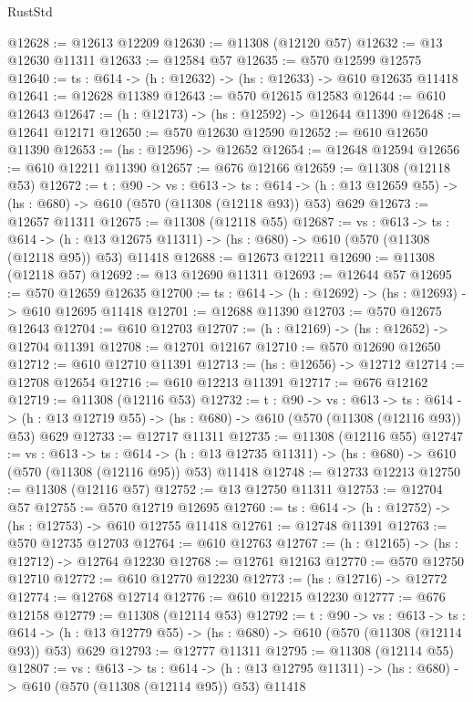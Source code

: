 \begin{lexlean}{RustStd}
\begin{coremodule}
@12628 := @12613 @12209
@12630 := @11308 (@12120 @57)
@12632 := @13 @12630 @11311
@12633 := @12584 @57
@12635 := @570 @12599 @12575
@12640 := {ts : @614} -> (h : @12632) -> (hs : @12633) -> @610 @12635 @11418
@12641 := @12628 @11389
@12643 := @570 @12615 @12583
@12644 := @610 @12643
@12647 := (h : @12173) -> (hs : @12592) -> @12644 @11390
@12648 := @12641 @12171
@12650 := @570 @12630 @12590
@12652 := @610 @12650 @11390
@12653 := (hs : @12596) -> @12652
@12654 := @12648 @12594
@12656 := @610 @12211 @11390
@12657 := @676 @12166
@12659 := @11308 (@12118 @53)
@12672 := {t : @90} ->
  {vs : @613} ->
  {ts : @614} -> (h : @13 @12659 @55) -> (hs : @680) -> @610 (@570 (@11308 (@12118 @93)) @53) @629
@12673 := @12657 @11311
@12675 := @11308 (@12118 @55)
@12687 := {vs : @613} ->
  {ts : @614} ->
  (h : @13 @12675 @11311) -> (hs : @680) -> @610 (@570 (@11308 (@12118 @95)) @53) @11418
@12688 := @12673 @12211
@12690 := @11308 (@12118 @57)
@12692 := @13 @12690 @11311
@12693 := @12644 @57
@12695 := @570 @12659 @12635
@12700 := {ts : @614} -> (h : @12692) -> (hs : @12693) -> @610 @12695 @11418
@12701 := @12688 @11390
@12703 := @570 @12675 @12643
@12704 := @610 @12703
@12707 := (h : @12169) -> (hs : @12652) -> @12704 @11391
@12708 := @12701 @12167
@12710 := @570 @12690 @12650
@12712 := @610 @12710 @11391
@12713 := (hs : @12656) -> @12712
@12714 := @12708 @12654
@12716 := @610 @12213 @11391
@12717 := @676 @12162
@12719 := @11308 (@12116 @53)
@12732 := {t : @90} ->
  {vs : @613} ->
  {ts : @614} -> (h : @13 @12719 @55) -> (hs : @680) -> @610 (@570 (@11308 (@12116 @93)) @53) @629
@12733 := @12717 @11311
@12735 := @11308 (@12116 @55)
@12747 := {vs : @613} ->
  {ts : @614} ->
  (h : @13 @12735 @11311) -> (hs : @680) -> @610 (@570 (@11308 (@12116 @95)) @53) @11418
@12748 := @12733 @12213
@12750 := @11308 (@12116 @57)
@12752 := @13 @12750 @11311
@12753 := @12704 @57
@12755 := @570 @12719 @12695
@12760 := {ts : @614} -> (h : @12752) -> (hs : @12753) -> @610 @12755 @11418
@12761 := @12748 @11391
@12763 := @570 @12735 @12703
@12764 := @610 @12763
@12767 := (h : @12165) -> (hs : @12712) -> @12764 @12230
@12768 := @12761 @12163
@12770 := @570 @12750 @12710
@12772 := @610 @12770 @12230
@12773 := (hs : @12716) -> @12772
@12774 := @12768 @12714
@12776 := @610 @12215 @12230
@12777 := @676 @12158
@12779 := @11308 (@12114 @53)
@12792 := {t : @90} ->
  {vs : @613} ->
  {ts : @614} -> (h : @13 @12779 @55) -> (hs : @680) -> @610 (@570 (@11308 (@12114 @93)) @53) @629
@12793 := @12777 @11311
@12795 := @11308 (@12114 @55)
@12807 := {vs : @613} ->
  {ts : @614} ->
  (h : @13 @12795 @11311) -> (hs : @680) -> @610 (@570 (@11308 (@12114 @95)) @53) @11418

\end{coremodule}
\end{lexlean}
